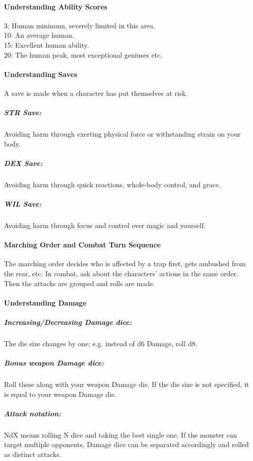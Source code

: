 \documentclass[itdr]{subfiles}
\begin{document}
\paragraph{Understanding Ability Scores}
3: Human minimum, severely limited in this area.\\
10: An average human.\\
15: Excellent human ability.\\
20: The human peak, most exceptional geniuses etc.

\vfill

\paragraph{Understanding Saves}
A save is made  when a character has put themselves at risk.

\subparagraph{STR Save:} Avoiding harm through exerting physical force or withstanding strain on your body.

\subparagraph{DEX Save:} Avoiding harm through quick reactions, whole-body control, and grace.

\subparagraph{WIL Save:} Avoiding harm through focus and control over magic and yourself.

\vfill
\break

\paragraph{Marching Order and Combat Turn Sequence}
The marching order decides who is affected by a trap first, gets ambushed from the rear, etc. In combat, ask about the characters' actions in the same order. Then the attacks are grouped and rolls are made.

\vfill

\paragraph{Understanding Damage}
\subparagraph{Increasing/Decreasing Damage dice:} The die size changes by one; e.g. instead of d6 Damage, roll d8.

\subparagraph{Bonus weapon Damage dice:} Roll these along with your weapon Damage die. If the die size is not \mbox{specified}, it is equal to your weapon Damage die.

\subparagraph{Attack notation:} NdX means rolling N dice and taking the best single one. If the monster can target multiple opponents, Damage dice can be separated accordingly and rolled as distinct attacks.
\end{document}
